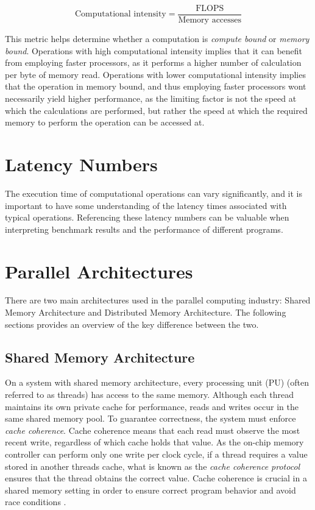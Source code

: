 \begin{equation}
    \text{Computational intensity} = \frac{\text{FLOPS}}{\text{Memory accesses}}
    \label{eq:computationaldensity}
\end{equation}

This metric helps determine whether a computation is \textit{compute bound} or \textit{memory bound}. Operations with high computational intensity implies that it can benefit from employing faster processors, as it performs a higher number of calculation per byte of memory read. Operations with lower computational intensity implies that the operation in memory bound, and thus employing faster processors wont necessarily yield higher performance, as the limiting factor is not the speed at which the calculations are performed, but rather the speed at which the required memory to perform the operation can be accessed at.

\section{Latency Numbers}
The execution time of computational operations can vary significantly, and it is important to have some understanding of the latency times associated with typical operations. Referencing these latency numbers can be valuable when interpreting benchmark results and the performance of different programs.


\section{Parallel Architectures}
There are two main architectures used in the parallel computing industry: Shared Memory Architecture and Distributed Memory Architecture. The following sections provides an overview of the key difference between the two.

\subsection{Shared Memory Architecture}
On a system with shared memory architecture, every processing unit (PU) (often referred to as threads) has access to the same memory. Although each thread maintains its own private cache for performance, reads and writes occur in the same shared memory pool. To guarantee correctness, the system must enforce \emph{cache coherence}. Cache coherence means that each read must observe the most recent write, regardless of which cache holds that value. As the on-chip memory controller can perform only one write per clock cycle, if a thread requires a value stored in another threads cache, what is known as the \textit{cache coherence protocol} ensures that the thread obtains the correct value. Cache coherence is crucial in a shared memory setting in order to ensure correct program behavior and avoid race conditions \cite{55497}.

